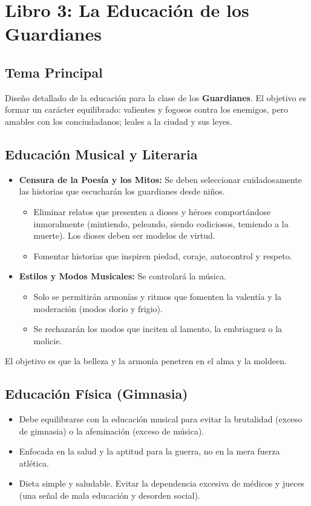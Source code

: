 \documentclass[11pt, a4paper]{article}
\begin{document}
\section*{Libro 3: La Educación de los Guardianes}

\subsection*{Tema Principal}
Diseño detallado de la educación para la clase de los \textbf{Guardianes}. El objetivo es formar un carácter equilibrado: valientes y fogosos contra los enemigos, pero amables con los conciudadanos; leales a la ciudad y sus leyes.

\subsection*{Educación Musical y Literaria}
\begin{itemize}
    \item \textbf{Censura de la Poesía y los Mitos:} Se deben seleccionar cuidadosamente las historias que escucharán los guardianes desde niños.
        \begin{itemize}
            \item Eliminar relatos que presenten a dioses y héroes comportándose inmoralmente (mintiendo, peleando, siendo codiciosos, temiendo a la muerte). Los dioses deben ser modelos de virtud.
            \item Fomentar historias que inspiren piedad, coraje, autocontrol y respeto.
        \end{itemize}
    \item \textbf{Estilos y Modos Musicales:} Se controlará la música.
        \begin{itemize}
            \item Solo se permitirán armonías y ritmos que fomenten la valentía y la moderación (modos dorio y frigio).
            \item Se rechazarán los modos que inciten al lamento, la embriaguez o la molicie.
        \end{itemize}
\end{itemize}
El objetivo es que la belleza y la armonía penetren en el alma y la moldeen.

\subsection*{Educación Física (Gimnasia)}
\begin{itemize}
    \item Debe equilibrarse con la educación musical para evitar la brutalidad (exceso de gimnasia) o la afeminación (exceso de música).
    \item Enfocada en la salud y la aptitud para la guerra, no en la mera fuerza atlética.
    \item Dieta simple y saludable. Evitar la dependencia excesiva de médicos y jueces (una señal de mala educación y desorden social).
\end{itemize}
\end{document}
